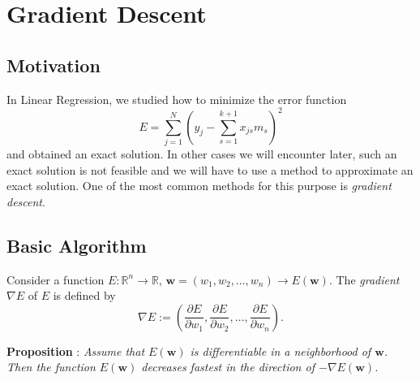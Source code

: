 \documentclass[
]{article}
\author{}
\date{}
\begin{document}
\newcommand{\Ber}{\operatorname{Ber}}
\newcommand{\E}{\operatorname{E}}
\newcommand{\V}{\operatorname{Var}}
\newcommand{\diag}{\operatorname{diag}}

\newcommand{\bi}{\mathbf{i}}
\newcommand{\bj}{\mathbf{j}}
\newcommand{\bt}{\mathbf{t}}

\newcommand{\bw}{{\boldsymbol{w}}}
\newcommand{\bu}{{\boldsymbol{u}}}
\newcommand{\bv}{{\boldsymbol{v}}}
\newcommand{\bx}{{\boldsymbol{x}}}
\newcommand{\by}{{\boldsymbol{y}}}
\newcommand{\bb}{{\boldsymbol{b}}}
\newcommand{\bz}{{\boldsymbol{z}}}
\newcommand{\bX}{{\boldsymbol{X}}}
\newcommand{\bY}{{\boldsymbol{Y}}}
\newcommand{\bZ}{{\boldsymbol{Z}}}

\hypertarget{gradient-descent}{%
\section{Gradient Descent}\label{gradient-descent}}

\hypertarget{motivation}{%
\subsection{Motivation}\label{motivation}}

In Linear Regression, we studied how to minimize the error function
\[ E = \sum_{j=1}^{N} (y_j-\sum_{s=1}^{k+1} x_{js}m_{s})^2 \] and
obtained an exact solution. In other cases we will encounter later, such
an exact solution is not feasible and we will have to use a method to
approximate an exact solution. One of the most common methods for this
purpose is \emph{gradient descent}.

\hypertarget{basic-algorithm}{%
\subsection{Basic Algorithm}\label{basic-algorithm}}

Consider a function \(E: \mathbb R^n \rightarrow \mathbb R\),
\({\boldsymbol{w}}=(w_1, w_2, \dots , w_n) \rightarrow E({\boldsymbol{w}})\).
The \emph{gradient} \(\nabla E\) of \(E\) is defined by
\[  \nabla E := \left ( \frac {\partial E}{\partial w_1}, \frac {\partial E}{\partial w_2}, \dots , \frac {\partial E}{\partial w_n} \right ). \]

\textbf{Proposition }: \emph{Assume that \(E({\boldsymbol{w}})\) is
differentiable in a neighborhood of \({\boldsymbol{w}}\). Then the
function \(E({\boldsymbol{w}})\) decreases fastest in the direction of
\(-\nabla E ({\boldsymbol{w}})\).}
\end{document}
